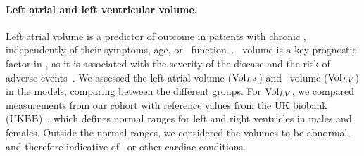 \paragraph{Left atrial and left ventricular volume.} 
Left atrial volume is a predictor of outcome in patients with chronic \HF, 
independently of their symptoms, age, or \LV\ function~\cite{rossi-2007-lav}. 
\LV\ volume is a key prognostic factor in \HF, 
as it is associated with the severity of the disease and the risk of 
adverse events~\cite{kasa-2024-lv_volume,ito-2021-lv_volume}.
We assessed the left atrial volume ($\mathrm{Vol}_{LA}$) and \LV\ volume ($\mathrm{Vol}_{LV}$) in the models, 
comparing between the different groups.
For $\mathrm{Vol}_{LV}$, we compared measurements from our cohort with reference values from the UK biobank 
(UKBB)~\cite{petersen-2017-reference}, which defines normal ranges for left and right ventricles
in males and females. 
Outside the normal ranges, we considered the volumes to be abnormal,
and therefore indicative of \HF\ or other cardiac conditions. 




% 